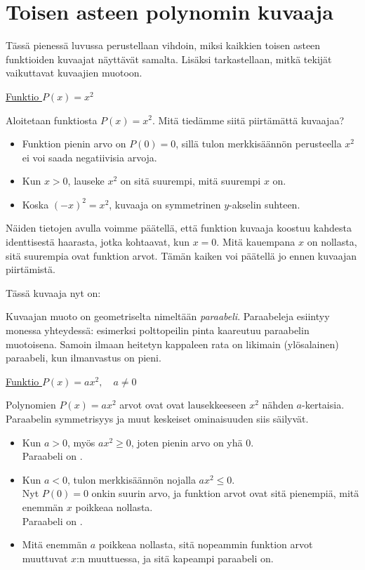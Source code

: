 \chapter{Toisen asteen polynomin kuvaaja}

Tässä pienessä luvussa perustellaan vihdoin, miksi kaikkien toisen asteen funktioiden
kuvaajat näyttävät samalta. Lisäksi tarkastellaan, mitkä tekijät vaikuttavat kuvaajien
muotoon.

\underline{Funktio $P(x)=x^2$}

Aloitetaan funktiosta $P(x)=x^2$. Mitä tiedämme siitä piirtämättä kuvaajaa?
\begin{itemize}
\item Funktion pienin arvo on $P(0) = 0$, sillä tulon merkkisäännön perusteella $x^2$ ei voi saada negatiivisia arvoja.
\item Kun $x > 0$, lauseke $x^2$  on sitä
suurempi, mitä suurempi $x$ on.
\item Koska $(-x)^2 = x^2$, kuvaaja on symmetrinen $y$-akselin suhteen.
\end{itemize}

Näiden tietojen avulla voimme päätellä, että funktion kuvaaja koostuu kahdesta
identtisestä haarasta, jotka kohtaavat, kun $x=0$. Mitä kauempana $x$ on nollasta,
sitä suurempia ovat funktion arvot. Tämän kaiken voi päätellä jo ennen kuvaajan
piirtämistä.

Tässä kuvaaja nyt on:
\begin{center}
\begin{kuvaajapohja}{2}{-2}{2}{-1}{4}
\end{kuvaajapohja}
\end{center}
Kuvaajan muoto on geometriselta nimeltään \emph{paraabeli}. Paraabeleja esiintyy monessa yhteydessä: esimerksi polttopeilin pinta kaareutuu paraabelin muotoisena. Samoin ilmaan heitetyn kappaleen
rata on likimain (ylösalainen) paraabeli, kun ilmanvastus on pieni.

\underline{Funktio $P(x)=ax^2, \quad a\neq 0$}

Polynomien $P(x)=ax^2$ arvot ovat ovat lausekkeeseen $x^2$ nähden $a$-kertaisia. Paraabelin symmetrisyys ja muut keskeiset ominaisuuden siis säilyvät.

\begin{itemize}
\item Kun $a > 0$, myös $ax^2\geq 0$, joten pienin arvo on yhä $0$.\\
Paraabeli on .
\item Kun $a < 0$, tulon merkkisäännön nojalla $ax^2 \leq 0$. \\
 Nyt $P(0)=0$ onkin suurin arvo, ja funktion arvot ovat sitä pienempiä,
mitä enemmän $x$ poikkeaa nollasta. \\
Paraabeli on .
\item Mitä enemmän $a$ poikkeaa nollasta, sitä nopeammin funktion arvot
muuttuvat $x$:n muuttuessa, ja sitä kapeampi paraabeli on.
\end{itemize}

